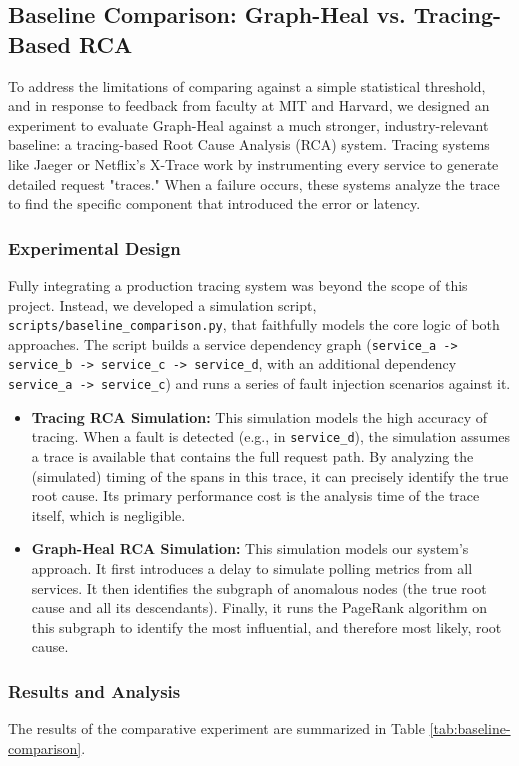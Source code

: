 \documentclass[11pt,conference]{IEEEtran}
\begin{document}
\subsection{Baseline Comparison: Graph-Heal vs. Tracing-Based RCA}
To address the limitations of comparing against a simple statistical threshold, and in response to feedback from faculty at MIT and Harvard, we designed an experiment to evaluate Graph-Heal against a much stronger, industry-relevant baseline: a tracing-based Root Cause Analysis (RCA) system. Tracing systems like Jaeger or Netflix's X-Trace work by instrumenting every service to generate detailed request "traces." When a failure occurs, these systems analyze the trace to find the specific component that introduced the error or latency.

\subsubsection{Experimental Design}
Fully integrating a production tracing system was beyond the scope of this project. Instead, we developed a simulation script, \texttt{scripts/baseline\_comparison.py}, that faithfully models the core logic of both approaches. The script builds a service dependency graph (\texttt{service\_a -> service\_b -> service\_c -> service\_d}, with an additional dependency \texttt{service\_a -> service\_c}) and runs a series of fault injection scenarios against it.

\begin{itemize}
    \item \textbf{Tracing RCA Simulation:} This simulation models the high accuracy of tracing. When a fault is detected (e.g., in \texttt{service\_d}), the simulation assumes a trace is available that contains the full request path. By analyzing the (simulated) timing of the spans in this trace, it can precisely identify the true root cause. Its primary performance cost is the analysis time of the trace itself, which is negligible.
    \item \textbf{Graph-Heal RCA Simulation:} This simulation models our system's approach. It first introduces a delay to simulate polling metrics from all services. It then identifies the subgraph of anomalous nodes (the true root cause and all its descendants). Finally, it runs the PageRank algorithm on this subgraph to identify the most influential, and therefore most likely, root cause.
\end{itemize}

\subsubsection{Results and Analysis}
The results of the comparative experiment are summarized in Table \ref{tab:baseline-comparison}.
\end{document}
